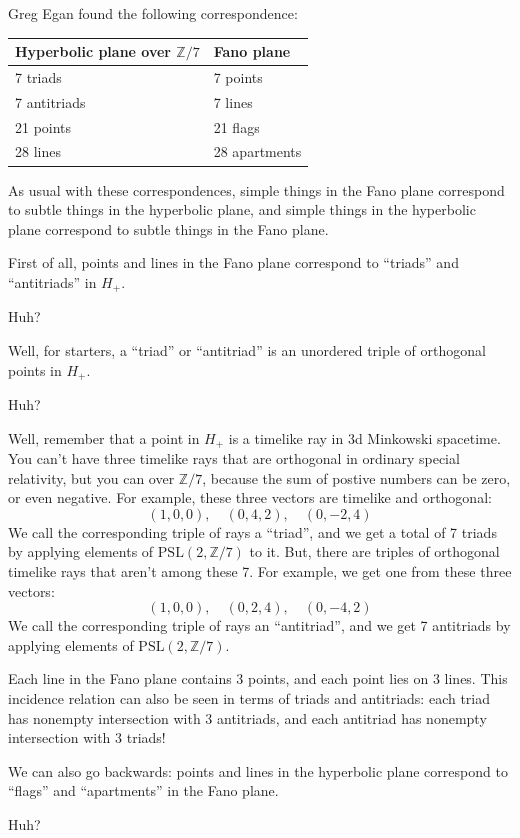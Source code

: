 \documentclass{article}
\begin{document}
Greg Egan found the following correspondence:

\begin{longtable}[]{@{}ll@{}}
\toprule
Hyperbolic plane over \(\mathbb{Z}/7\) & Fano plane\tabularnewline
\midrule
\endhead
7 triads & 7 points\tabularnewline
7 antitriads & 7 lines\tabularnewline
21 points & 21 flags\tabularnewline
28 lines & 28 apartments\tabularnewline
\bottomrule
\end{longtable}

As usual with these correspondences, simple things in the Fano plane
correspond to subtle things in the hyperbolic plane, and simple things
in the hyperbolic plane correspond to subtle things in the Fano plane.

First of all, points and lines in the Fano plane correspond to
``triads'' and ``antitriads'' in \(H_+\).

Huh?

Well, for starters, a ``triad'' or ``antitriad'' is an unordered triple
of orthogonal points in \(H_+\).

Huh?

Well, remember that a point in \(H_+\) is a timelike ray in 3d Minkowski
spacetime. You can't have three timelike rays that are orthogonal in
ordinary special relativity, but you can over \(\mathbb{Z}/7\), because
the sum of postive numbers can be zero, or even negative. For example,
these three vectors are timelike and orthogonal:
\[(1,0,0), \quad (0,4,2), \quad (0,-2,4)\] We call the corresponding
triple of rays a ``triad'', and we get a total of 7 triads by applying
elements of \(\mathrm{PSL}(2,\mathbb{Z}/7)\) to it. But, there are
triples of orthogonal timelike rays that aren't among these 7. For
example, we get one from these three vectors:
\[(1,0,0), \quad (0,2,4), \quad (0,-4,2)\] We call the corresponding
triple of rays an ``antitriad'', and we get 7 antitriads by applying
elements of \(\mathrm{PSL}(2,\mathbb{Z}/7)\).

Each line in the Fano plane contains 3 points, and each point lies on 3
lines. This incidence relation can also be seen in terms of triads and
antitriads: each triad has nonempty intersection with 3 antitriads, and
each antitriad has nonempty intersection with 3 triads!

We can also go backwards: points and lines in the hyperbolic plane
correspond to ``flags'' and ``apartments'' in the Fano plane.

Huh?
\end{document}
